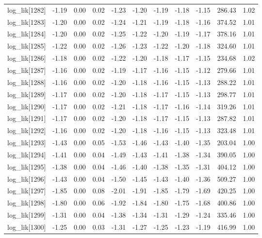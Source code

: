 \begin{table}[ht]
\begin{tabular}{rrrrrrrrrrr}
  log\_lik[1282] & -1.19 & 0.00 & 0.02 & -1.23 & -1.20 & -1.19 & -1.18 & -1.15 & 286.43 & 1.02 \\ 
  log\_lik[1283] & -1.20 & 0.00 & 0.02 & -1.24 & -1.21 & -1.19 & -1.18 & -1.16 & 374.52 & 1.01 \\ 
  log\_lik[1284] & -1.20 & 0.00 & 0.02 & -1.25 & -1.22 & -1.20 & -1.19 & -1.17 & 378.16 & 1.01 \\ 
  log\_lik[1285] & -1.22 & 0.00 & 0.02 & -1.26 & -1.23 & -1.22 & -1.20 & -1.18 & 324.60 & 1.01 \\ 
  log\_lik[1286] & -1.18 & 0.00 & 0.02 & -1.22 & -1.20 & -1.18 & -1.17 & -1.15 & 234.68 & 1.02 \\ 
  log\_lik[1287] & -1.16 & 0.00 & 0.02 & -1.19 & -1.17 & -1.16 & -1.15 & -1.12 & 279.66 & 1.01 \\ 
  log\_lik[1288] & -1.16 & 0.00 & 0.02 & -1.20 & -1.18 & -1.16 & -1.15 & -1.13 & 288.22 & 1.01 \\ 
  log\_lik[1289] & -1.17 & 0.00 & 0.02 & -1.20 & -1.18 & -1.17 & -1.15 & -1.13 & 298.77 & 1.01 \\ 
  log\_lik[1290] & -1.17 & 0.00 & 0.02 & -1.21 & -1.18 & -1.17 & -1.16 & -1.14 & 319.26 & 1.01 \\ 
  log\_lik[1291] & -1.17 & 0.00 & 0.02 & -1.20 & -1.18 & -1.17 & -1.15 & -1.13 & 287.82 & 1.01 \\ 
  log\_lik[1292] & -1.16 & 0.00 & 0.02 & -1.20 & -1.18 & -1.16 & -1.15 & -1.13 & 323.48 & 1.01 \\ 
  log\_lik[1293] & -1.43 & 0.00 & 0.05 & -1.53 & -1.46 & -1.43 & -1.40 & -1.35 & 203.04 & 1.00 \\ 
  log\_lik[1294] & -1.41 & 0.00 & 0.04 & -1.49 & -1.43 & -1.41 & -1.38 & -1.34 & 390.05 & 1.00 \\ 
  log\_lik[1295] & -1.38 & 0.00 & 0.04 & -1.46 & -1.40 & -1.38 & -1.35 & -1.31 & 404.12 & 1.00 \\ 
  log\_lik[1296] & -1.43 & 0.00 & 0.04 & -1.50 & -1.45 & -1.43 & -1.40 & -1.36 & 509.27 & 1.00 \\ 
  log\_lik[1297] & -1.85 & 0.00 & 0.08 & -2.01 & -1.91 & -1.85 & -1.79 & -1.69 & 420.25 & 1.00 \\ 
  log\_lik[1298] & -1.80 & 0.00 & 0.06 & -1.92 & -1.84 & -1.80 & -1.75 & -1.68 & 400.86 & 1.00 \\ 
  log\_lik[1299] & -1.31 & 0.00 & 0.04 & -1.38 & -1.34 & -1.31 & -1.29 & -1.24 & 335.46 & 1.00 \\ 
  log\_lik[1300] & -1.25 & 0.00 & 0.03 & -1.31 & -1.27 & -1.25 & -1.23 & -1.19 & 416.99 & 1.00 \\ 

\end{tabular}
\end{table}
